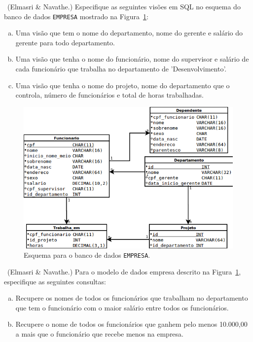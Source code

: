 \exercise~(Elmasri \& Navathe.) Especifique as seguintes visões em SQL no
esquema do banco de dados {\tt EMPRESA} mostrado na
Figura~\ref{fig:empresa}:

\begin{enumerate}[a)]
\item Uma visão que tem o nome do departamento, nome do gerente
  e salário do gerente para todo departamento.
\item Uma visão que tenha o nome do funcionário, nome do supervisor
  e salário de cada funcionário que trabalha no departamento de
  'Desenvolvimento'.
\item Uma visão que tenha o nome do projeto, nome do departamento que
  o controla, número de funcionários e total de horas trabalhadas.
\end{enumerate}

\begin{figure}[ht]
  \centering
  \includegraphics[scale=.4]{../empresa.png}
  \caption{Esquema para o banco de dados {\tt EMPRESA}.}
  \label{fig:empresa}
\end{figure}

\exercise~(Elmasri \& Navathe.) Para o modelo de dados empresa descrito na
Figura~\ref{fig:empresa}, especifique as seguintes consultas:

\begin{enumerate}[a)]
\item Recupere os nomes de todos os funcionários que trabalham no
  departamento que tem o funcionário com o maior salário entre todos
  os funcionários.
\item Recupere o nome de todos os funcionários que ganhem pelo menos
  10.000,00 a mais que o funcionário que recebe menos na empresa.
\end{enumerate}


